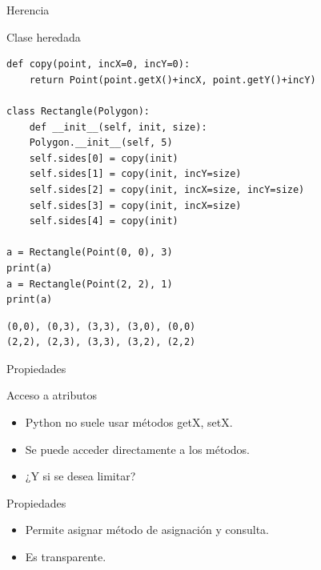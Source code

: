 \documentclass[bigger,unknownkeysallowed]{beamer}
\begin{document}
\begin{frame}[fragile,label={sec:org54db9c3}]{Herencia}
 \begin{block}{Clase heredada}
\begin{verbatim}
def copy(point, incX=0, incY=0):
    return Point(point.getX()+incX, point.getY()+incY)

class Rectangle(Polygon):
    def __init__(self, init, size):
	Polygon.__init__(self, 5)
	self.sides[0] = copy(init)
	self.sides[1] = copy(init, incY=size)
	self.sides[2] = copy(init, incX=size, incY=size)
	self.sides[3] = copy(init, incX=size)
	self.sides[4] = copy(init)

a = Rectangle(Point(0, 0), 3)
print(a)
a = Rectangle(Point(2, 2), 1)
print(a)
\end{verbatim}
\scriptsize
\begin{verbatim}
(0,0), (0,3), (3,3), (3,0), (0,0)
(2,2), (2,3), (3,3), (3,2), (2,2)
\end{verbatim}
\end{block}
\end{frame}

\begin{frame}[label={sec:org56de69e}]{Propiedades}
\begin{block}{Acceso a atributos}
\begin{itemize}
\item Python no suele usar métodos getX, setX.

\item Se puede acceder directamente a los métodos.

\item ¿Y si se desea limitar?
\end{itemize}
\end{block}

\begin{block}{Propiedades}
\begin{itemize}
\item Permite asignar método de asignación y consulta.

\item Es transparente.
\end{itemize}
\end{block}
\end{frame}
\end{document}
